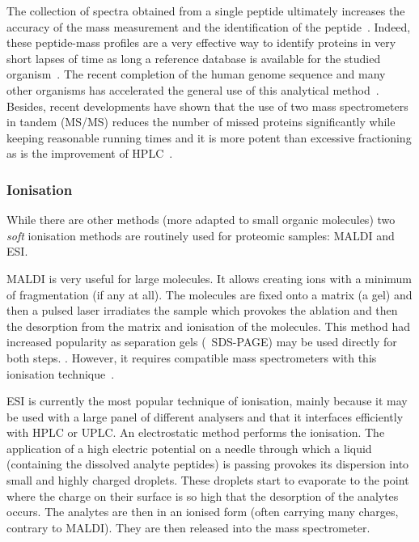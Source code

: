 The collection of spectra obtained from a single peptide ultimately increases the accuracy of
the mass measurement and the identification of the peptide~.
Indeed, these peptide-mass profiles are a very effective way to identify
proteins in very short lapses of time as long a reference database is available
for the studied organism~. The recent completion of the human
genome sequence and many other organisms has accelerated the general use of this
analytical method~. Besides, recent developments have
shown that the use of two mass spectrometers in tandem (\gls{MS/MS}) reduces
the number of missed proteins significantly while keeping reasonable running
times and it is more potent than excessive fractioning as is the improvement
of \gls{HPLC}~.\mybr\

\subsubsection{Ionisation}

While there are other methods (more adapted to small organic molecules)
two \emph{soft} ionisation methods are routinely used for proteomic samples:
\acrfull{MALDI} and \acrfull{ESI}.\mybr\

\gls{MALDI} is very useful for large molecules. It allows creating ions with a
minimum of fragmentation (if any at all). The molecules are fixed onto a matrix
(a gel) and then a pulsed \gls{laser} irradiates the sample which provokes the
ablation and then the desorption from the matrix and ionisation of the molecules.
This method had increased popularity as separation gels (\eg\ \gls{SDS-PAGE})
may be used directly for both steps. .
However, it requires compatible mass spectrometers
with this ionisation technique~.\mybr\

\gls{ESI} is currently the most popular technique of ionisation, mainly
because it may be used with a large panel of different analysers and that it
interfaces efficiently with \gls{HPLC} or \gls{UPLC}.
An electrostatic method performs the ionisation.
The application of a high electric potential on
a needle through which a liquid (containing the dissolved analyte peptides)
is passing provokes its dispersion into small and highly charged droplets.
These droplets start to evaporate to the point where the charge on their surface
is so high that the desorption of the analytes occurs.
The analytes are then in an ionised form
(often carrying many charges, contrary to \gls{MALDI}).
They are then released into the mass spectrometer. \mybr\

